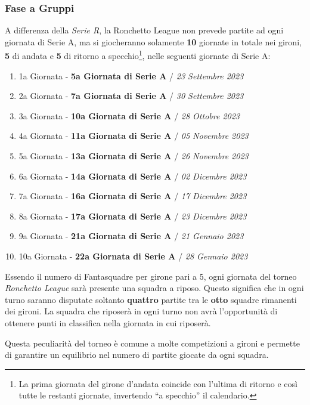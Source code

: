 \documentclass[12pt]{article}
\begin{document}
\subsubsection*{Fase a Gruppi}
A differenza della \textit{Serie R}, la Ronchetto League non prevede partite ad ogni giornata di Serie A, ma si giocheranno solamente \textbf{10} giornate in totale nei gironi, \textbf{5} di andata e \textbf{5} di ritorno a specchio\footnote{La prima giornata del girone d’andata coincide con l'ultima di ritorno e così tutte le restanti giornate, invertendo “a specchio” il calendario.}, nelle seguenti giornate di Serie A:
\begin{enumerate}
    \item 1a Giornata - \textbf{5a Giornata di Serie A} / \textit{23 Settembre 2023}
    \item 2a Giornata - \textbf{7a Giornata di Serie A} / \textit{30 Settembre 2023}
    \item 3a Giornata - \textbf{10a Giornata di Serie A} / \textit{28 Ottobre 2023}
    \item 4a Giornata - \textbf{11a Giornata di Serie A} / \textit{05 Novembre 2023}
    \item 5a Giornata - \textbf{13a Giornata di Serie A} / \textit{26 Novembre 2023}
    \item 6a Giornata - \textbf{14a Giornata di Serie A} / \textit{02 Dicembre 2023}
    \item 7a Giornata - \textbf{16a Giornata di Serie A} / \textit{17 Dicembre 2023}
    \item 8a Giornata - \textbf{17a Giornata di Serie A} / \textit{23 Dicembre 2023}
    \item 9a Giornata - \textbf{21a Giornata di Serie A} / \textit{21 Gennaio 2023}
    \item 10a Giornata - \textbf{22a Giornata di Serie A} / \textit{28 Gennaio 2023}
\end{enumerate}

Essendo il numero di Fantasquadre per girone pari a 5, ogni giornata del torneo \textit{Ronchetto League} sarà presente una squadra a riposo. Questo significa che in ogni turno saranno disputate soltanto \textbf{quattro} partite tra le \textbf{otto} squadre rimanenti dei gironi. La squadra che riposerà in ogni turno non avrà l'opportunità di ottenere punti in classifica nella giornata in cui riposerà. 

Questa peculiarità del torneo è comune a molte competizioni a gironi e permette di garantire un equilibrio nel numero di partite giocate da ogni squadra.
\end{document}
